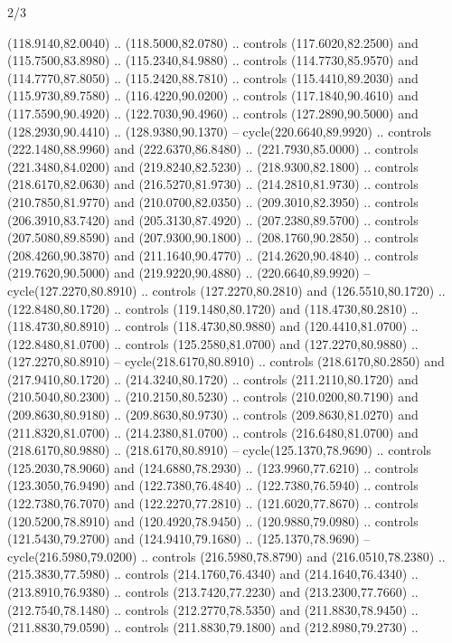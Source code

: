 \begin{flagdescription}{2/3}
\begin{scope}[xshift=0.5\flaglength,yshift=0.5\flagwidth,scale=\stretchfactor]
\begin{scope}[scale=0.001645\flagwidth,yshift=65mm,xshift=-63mm]
\begin{scope}[y=0.80pt, x=0.80pt, yscale=-1,]
\begin{scope}[cm={{1.33333,0.0,0.0,1.33333,(0.0,1e-05)}}]
  (118.9140,82.0040) .. (118.5000,82.0780) .. controls (117.6020,82.2500) and
  (115.7500,83.8980) .. (115.2340,84.9880) .. controls (114.7730,85.9570) and
  (114.7770,87.8050) .. (115.2420,88.7810) .. controls (115.4410,89.2030) and
  (115.9730,89.7580) .. (116.4220,90.0200) .. controls (117.1840,90.4610) and
  (117.5590,90.4920) .. (122.7030,90.4960) .. controls (127.2890,90.5000) and
  (128.2930,90.4410) .. (128.9380,90.1370) -- cycle(220.6640,89.9920) ..
  controls (222.1480,88.9960) and (222.6370,86.8480) .. (221.7930,85.0000) ..
  controls (221.3480,84.0200) and (219.8240,82.5230) .. (218.9300,82.1800) ..
  controls (218.6170,82.0630) and (216.5270,81.9730) .. (214.2810,81.9730) ..
  controls (210.7850,81.9770) and (210.0700,82.0350) .. (209.3010,82.3950) ..
  controls (206.3910,83.7420) and (205.3130,87.4920) .. (207.2380,89.5700) ..
  controls (207.5080,89.8590) and (207.9300,90.1800) .. (208.1760,90.2850) ..
  controls (208.4260,90.3870) and (211.1640,90.4770) .. (214.2620,90.4840) ..
  controls (219.7620,90.5000) and (219.9220,90.4880) .. (220.6640,89.9920) --
  cycle(127.2270,80.8910) .. controls (127.2270,80.2810) and (126.5510,80.1720)
  .. (122.8480,80.1720) .. controls (119.1480,80.1720) and (118.4730,80.2810) ..
  (118.4730,80.8910) .. controls (118.4730,80.9880) and (120.4410,81.0700) ..
  (122.8480,81.0700) .. controls (125.2580,81.0700) and (127.2270,80.9880) ..
  (127.2270,80.8910) -- cycle(218.6170,80.8910) .. controls (218.6170,80.2850)
  and (217.9410,80.1720) .. (214.3240,80.1720) .. controls (211.2110,80.1720)
  and (210.5040,80.2300) .. (210.2150,80.5230) .. controls (210.0200,80.7190)
  and (209.8630,80.9180) .. (209.8630,80.9730) .. controls (209.8630,81.0270)
  and (211.8320,81.0700) .. (214.2380,81.0700) .. controls (216.6480,81.0700)
  and (218.6170,80.9880) .. (218.6170,80.8910) -- cycle(125.1370,78.9690) ..
  controls (125.2030,78.9060) and (124.6880,78.2930) .. (123.9960,77.6210) ..
  controls (123.3050,76.9490) and (122.7380,76.4840) .. (122.7380,76.5940) ..
  controls (122.7380,76.7070) and (122.2270,77.2810) .. (121.6020,77.8670) ..
  controls (120.5200,78.8910) and (120.4920,78.9450) .. (120.9880,79.0980) ..
  controls (121.5430,79.2700) and (124.9410,79.1680) .. (125.1370,78.9690) --
  cycle(216.5980,79.0200) .. controls (216.5980,78.8790) and (216.0510,78.2380)
  .. (215.3830,77.5980) .. controls (214.1760,76.4340) and (214.1640,76.4340) ..
  (213.8910,76.9380) .. controls (213.7420,77.2230) and (213.2300,77.7660) ..
  (212.7540,78.1480) .. controls (212.2770,78.5350) and (211.8830,78.9450) ..
  (211.8830,79.0590) .. controls (211.8830,79.1800) and (212.8980,79.2730) ..

\end{scope}
\end{scope}
\end{scope}
\end{scope}
\end{flagdescription}
